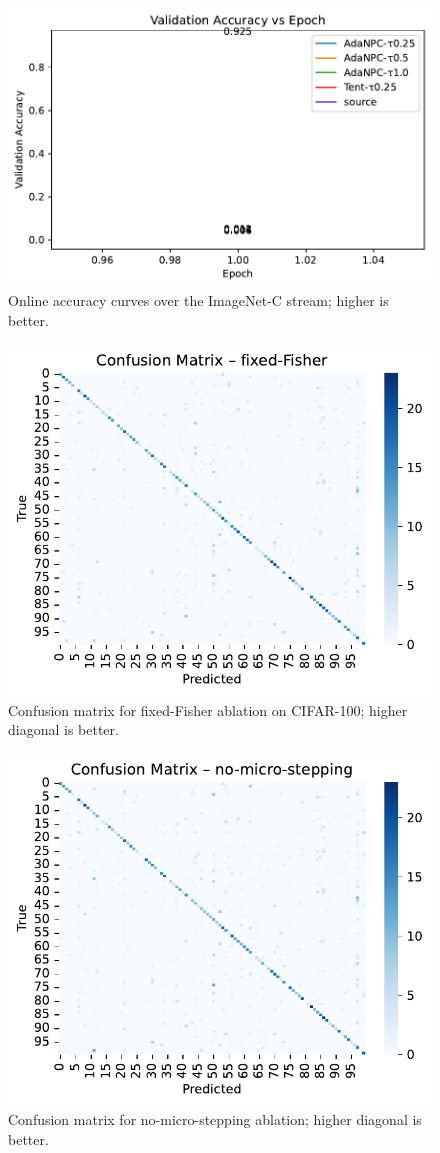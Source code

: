 \documentclass{article} %
\begin{document}
\begin{figure}[H]
  \centering
  \includegraphics[width=0.7\linewidth]{images/accuracy_curve.pdf}
  \caption{Online accuracy curves over the ImageNet-C stream; higher is better.}
\end{figure}
\begin{figure}[H]
  \centering
  \includegraphics[width=0.7\linewidth]{images/confusion_fixed-Fisher.pdf}
  \caption{Confusion matrix for fixed-Fisher ablation on CIFAR-100; higher diagonal is better.}
\end{figure}
\begin{figure}[H]
  \centering
  \includegraphics[width=0.7\linewidth]{images/confusion_no-micro-stepping.pdf}
  \caption{Confusion matrix for no-micro-stepping ablation; higher diagonal is better.}
\end{figure}
\end{document}
